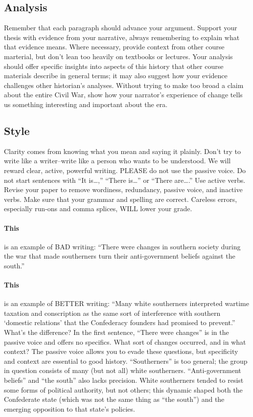 \documentclass{article}
\begin{document}
\subsection{Analysis}
Remember that each paragraph should advance your argument. Support your thesis
with evidence from your narrative, always remembering to explain what that
evidence means. Where necessary, provide context from other course marterial,
but don’t lean too heavily on textbooks or lectures. Your analysis should offer
specific insights into aspects of this history that other course materials
describe in general terms; it may also suggest how your evidence challenges
other historian’s analyses. Without trying to make too broad a claim about the
entire Civil War, show how your narrator’s experience of change tells us
something interesting and important about the era.

\subsection{Style}
Clarity comes from knowing what you mean and saying it plainly. Don’t try to write like a writer--write like a person who wants to be understood. We will reward clear, active, powerful writing. PLEASE do not use the passive voice. Do not start sentences with “It is\ldots,” “There is\ldots” or “There are\dots.” Use active verbs. Revise your paper to remove wordiness, redundancy, passive voice, and inactive verbs. Make sure that your grammar and spelling are correct. Careless errors, especially run-ons and comma splices, WILL lower your grade. 

\paragraph{This} is an example of BAD writing: “There were changes in southern society during the war that made southerners turn their anti-government beliefs against the south.”

\paragraph{This} is an example of BETTER writing: “Many white southerners interpreted wartime taxation and conscription as the same sort of interference with southern ‘domestic relations’ that the Confederacy founders had promised to prevent.”\\

What’s the difference? In the first sentence, “There were changes” is in the passive voice and offers no specifics. What sort of changes occurred, and in what context? The passive voice allows you to evade these questions, but specificity and context are essential to good history. “Southerners” is too general; the group in question consists of many (but not all) white southerners. “Anti-government beliefs” and “the south” also lacks precision. White southerners tended to resist some forms of political authority, but not others; this dynamic shaped both the Confederate state (which was not the same thing as “the south”) and the emerging opposition to that state’s policies.
\end{document}
